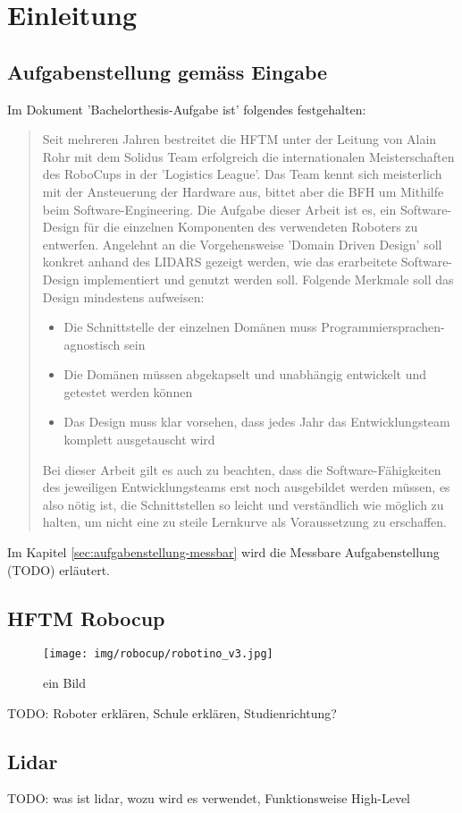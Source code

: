 \chapter{Einleitung}
\section{Aufgabenstellung gemäss Eingabe}
Im Dokument 'Bachelorthesis-Aufgabe ist' folgendes festgehalten:
\begin{quote}
Seit mehreren Jahren bestreitet die HFTM unter der Leitung von Alain Rohr mit dem Solidus Team erfolgreich die internationalen Meisterschaften des RoboCups in der 'Logistics League'.
Das Team kennt sich meisterlich mit der Ansteuerung der Hardware aus, bittet aber die BFH um Mithilfe beim Software-Engineering.
Die Aufgabe dieser Arbeit ist es, ein Software-Design für die einzelnen Komponenten des verwendeten Roboters zu entwerfen. Angelehnt an die Vorgehensweise 'Domain Driven Design' soll konkret anhand des LIDARS gezeigt werden, wie das erarbeitete Software-Design implementiert und genutzt werden soll. Folgende Merkmale soll das Design mindestens aufweisen:

\begin{itemize}
	\item Die Schnittstelle der einzelnen Domänen muss Programmiersprachen-agnostisch sein
	\item Die Domänen müssen abgekapselt und unabhängig entwickelt und getestet werden können
	\item Das Design muss klar vorsehen, dass jedes Jahr das Entwicklungsteam komplett ausgetauscht wird
\end{itemize}
Bei dieser Arbeit gilt es auch zu beachten, dass die Software-Fähigkeiten des jeweiligen Entwicklungsteams erst noch ausgebildet werden müssen, es also nötig ist, die Schnittstellen so leicht und verständlich wie möglich zu halten, um nicht eine zu steile Lernkurve als Voraussetzung zu erschaffen.
\end{quote}
Im Kapitel \ref{sec:aufgabenstellung-messbar} wird die Messbare Aufgabenstellung (TODO) erläutert.

\section{HFTM Robocup}
\begin{figure}[htbp]
	\centering
	\texttt{[image: img/robocup/robotino\_v3.jpg]}
	\caption{ein Bild\cite{robotino}}  
\end{figure}

TODO:
Roboter erklären, Schule erklären, Studienrichtung?

\section{Lidar}
TODO:
was ist \acrshort{lidar}, wozu wird es verwendet, Funktionsweise High-Level




